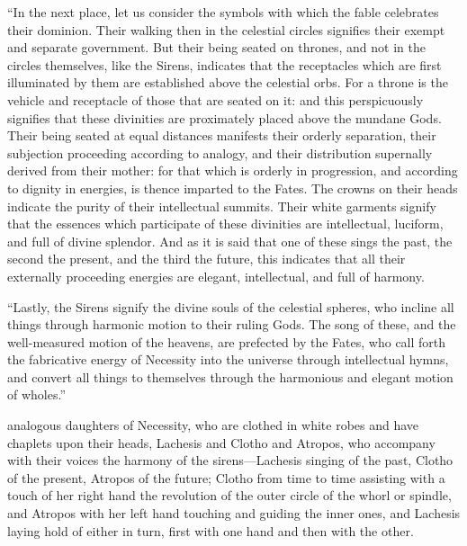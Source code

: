 \documentclass[12pt]{article}
\begin{document}
{``In the next place, let us consider the symbols with which the fable
celebrates their dominion. Their walking then in the celestial circles
signifies their exempt and separate government. But their being seated on
thrones, and not in the circles themselves, like the Sirens, indicates that the
receptacles which are first illuminated by them are established above the
celestial orbs. For a throne is the vehicle and receptacle of those that are
seated on it: and this perspicuously signifies that these divinities are
proximately placed above the mundane Gods. Their being seated at equal
distances manifests their orderly separation, their subjection proceeding
according to analogy, and their distribution supernally derived from their
mother: for that which is orderly in progression, and according to dignity in
energies, is thence imparted to the Fates. The crowns on their heads indicate
the purity{\footnotemark} of their intellectual summits. Their white garments
signify that the essences which participate of these divinities are
intellectual, luciform, and full of divine splendor. And as it is said that one
of these sings the past, the second the present, and the third the future, this
indicates that all their externally proceeding energies are elegant,
intellectual, and full of harmony.

``Lastly, the Sirens signify the divine souls of the celestial spheres, who
incline all things through harmonic motion to their ruling Gods. The song of
these, and the well-measured motion of the heavens, are prefected by the Fates,
who call forth the fabricative energy of Necessity into the universe through
intellectual hymns, and convert all things to themselves through the harmonious
and elegant motion of wholes.''} analogous daughters of Necessity, who are
clothed in white robes and have chaplets upon their heads, Lachesis and Clotho and
Atropos, who accompany with their voices the harmony of the sirens---Lachesis
singing of the past, Clotho of the present, Atropos of the future; Clotho from
time to time assisting with a touch of her right hand the revolution of the
outer circle of the whorl or spindle, and Atropos with her left hand touching
and guiding the inner ones, and Lachesis laying hold of either in turn, first
with one hand and then with the other.
\end{document}
